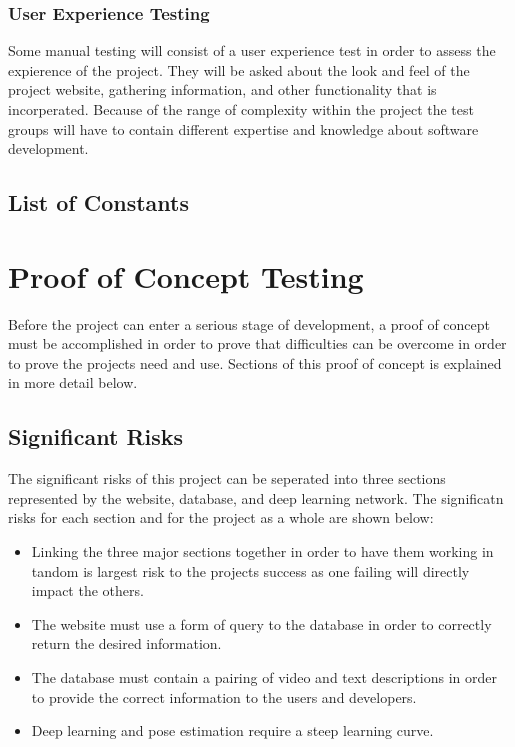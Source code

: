 \documentclass{scrreprt}
\begin{document}
\subsection{User Experience Testing}
Some manual testing will consist of a user experience test in order to assess the expierence of the project. They will be asked about the look and feel of the project website, gathering information, and other functionality that is incorperated. Because of the range of complexity within the project the test groups will have to contain different expertise and knowledge about software development.

\section{List of Constants}

\chapter{Proof of Concept Testing}
Before the project can enter a serious stage of development, a proof of concept must be accomplished in order to prove that difficulties can be overcome in order to prove the projects need and use. Sections of this proof of concept is explained in more detail below.

\section{Significant Risks}
The significant risks of this project can be seperated into three sections represented by the website, database, and deep learning network. The significatn risks for each section and for the project as a whole are shown below:

\begin{itemize}
  \item Linking the three major sections together in order to have them working in tandom is largest risk to the projects success as one failing will directly impact the others.
  \item The website must use a form of query to the database in order to correctly return the desired information.
  \item The database must contain a pairing of video and text descriptions in order to provide the correct information to the users and developers.
  \item Deep learning and pose estimation require a steep learning curve.
\end{itemize}
\end{document}
